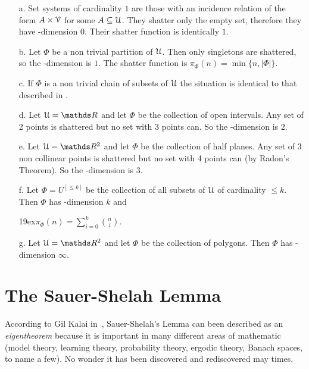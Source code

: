 \documentclass[sputnik.tex]{subfiles}
\begin{document}
\begin{example}\label{ex_vcdim}
\begin{itemize}
\item[a.] Set systems of cardinality $1$ are those with an incidence relation of the form $A\times\EuScript V$ for some $A\subseteq\EuScript U$.
They shatter only the empty set, therefore they have \vc-dimension $0$.
Their shatter function is identically $1$.
\item[b.] Let $\Phi$ be a non trivial partition of $\EuScript U$.
Then only singletons are shattered, so the \vc-dimension is $1$.
The shatter function is $\pi_\Phi(n)=\min\big\{n,|\Phi|\big\}$.
\item[c.] If $\Phi$ is a non trivial chain of subsets of $\EuScript U$ the situation is identical to that described in .
\item[d.] Let $\U=\RR$ and let $\Phi$ be the collection of open intervals.
Any set of 2 points is shattered but no set with 3 points can.
So the \vc-dimension is $2$.
\item[e.] Let $\U=\RR^2$ and let $\Phi$ be the collection of half planes.
Any set of 3 non collinear points is shattered but no set with 4 points can (by Radon's Theorem).
So the \vc-dimension is $3$.
\item[f.] Let $\Phi=U^{[\le k]}$ be the collection of all subsets of $\EuScript U$ of cardinality $\le k$.
Then $\Phi$ has \vc-dimension $k$ and

\noindent\kern19ex$\displaystyle\pi_\Phi(n)=\sum^k_{i=0} \binom{n}{i}$.


\item[g.] Let $\U=\RR^2$ and let $\Phi$ be the collection of polygons.
Then $\Phi$ has \vc-dimension $\infty$.\QED
\end{itemize}
\end{example}

\section{The Sauer-Shelah Lemma}

According to Gil Kalai in~\cite{kalai}, Sauer-Shelah's Lemma can been described as an \textit{eigentheorem\/} because it is important in many different areas of mathematic (model theory, learning theory, probability theory, ergodic theory, Banach spaces, to name a few).
No wonder it has been discovered and rediscovered may times.
\end{document}
